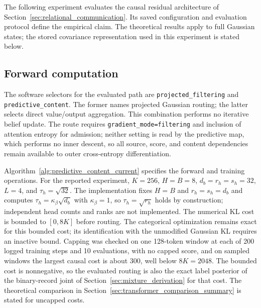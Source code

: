 \documentclass[twoside,11pt]{article}
\begin{document}
The following experiment evaluates the causal residual architecture of Section~\ref{sec:relational_communication}. Its saved configuration and evaluation protocol define the empirical claim. The theoretical results apply to full Gaussian states; the stored covariance representation used in this experiment is stated below.

\subsection{Forward computation}
The software selectors for the evaluated path are \texttt{projected\_\allowbreak filtering} and \texttt{predictive\_\allowbreak content}. The former names projected Gaussian routing; the latter selects direct value/output aggregation. This combination performs no iterative belief update. The route requires \texttt{gradient\_\allowbreak mode=\allowbreak filtering} and inclusion of attention entropy for admission; neither setting is read by the predictive map, which performs no inner descent, so all source, score, and content dependencies remain available to outer cross-entropy differentiation.

Algorithm~\ref{alg:predictive_content_current} specifies the forward and training operations. For the reported experiment, \(K=256\), \(H=B=8\), \(d_b=r_h=s_h=32\), \(L=4\), and \(\tau_h=\sqrt{32}\). The implementation fixes \(H=B\) and \(r_h=s_h=d_b\) and computes \(\tau_h=\kappa_\beta\sqrt{d_b}\) with \(\kappa_\beta=1\), so \(\tau_h=\sqrt{r_h}\) holds by construction; independent head counts and ranks are not implemented. The numerical KL cost is bounded to \([0,8K]\) before routing. The categorical optimization remains exact for this bounded cost; its identification with the unmodified Gaussian KL requires an inactive bound. Capping was checked on one 128-token window at each of 200 logged training steps and 10 evaluations, with no capped score, and on sampled windows the largest causal cost is about 300, well below \(8K=2048\). The bounded cost is nonnegative, so the evaluated routing is also the exact label posterior of the binary-record joint of Section~\ref{sec:mixture_derivation} for that cost. The theoretical comparison in Section~\ref{sec:transformer_comparison_summary} is stated for uncapped costs.
\end{document}

